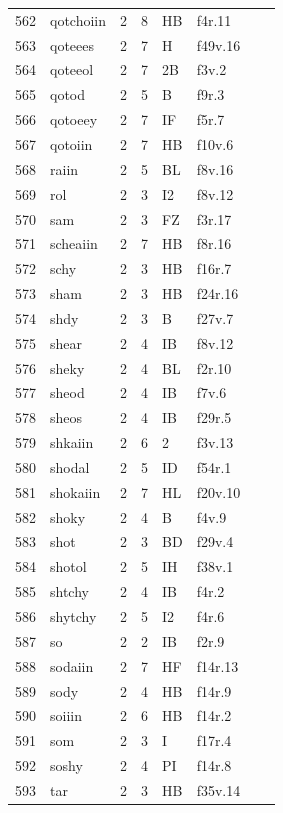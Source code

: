 \documentclass[11pt,a4paper]{article}
\begin{document}
\begin{landscape}
\begin{longtable}{@{}r>{\ttfamily}lrrl>{\ttfamily}l>{\raggedright\arraybackslash}p{80mm}>{\raggedright\arraybackslash}p{36mm}@{}}
562 & qotchoiin & 2 & 8 & HB & f4r.11 &  & \\
563 & qoteees & 2 & 7 & H & f49v.16 &  & \\
564 & qoteeol & 2 & 7 & 2B & f3v.2 &  & \\
565 & qotod & 2 & 5 & B & f9r.3 &  & \\
566 & qotoeey & 2 & 7 & IF & f5r.7 &  & \\
567 & qotoiin & 2 & 7 & HB & f10v.6 &  & \\
568 & raiin & 2 & 5 & BL & f8v.16 &  & \\
569 & rol & 2 & 3 & I2 & f8v.12 &  & \\
570 & sam & 2 & 3 & FZ & f3r.17 &  & \\
571 & scheaiin & 2 & 7 & HB & f8r.16 &  & \\
572 & schy & 2 & 3 & HB & f16r.7 &  & \\
573 & sham & 2 & 3 & HB & f24r.16 &  & \\
574 & shdy & 2 & 3 & B & f27v.7 &  & \\
575 & shear & 2 & 4 & IB & f8v.12 &  & \\
576 & sheky & 2 & 4 & BL & f2r.10 &  & \\
577 & sheod & 2 & 4 & IB & f7v.6 &  & \\
578 & sheos & 2 & 4 & IB & f29r.5 &  & \\
579 & shkaiin & 2 & 6 & 2 & f3v.13 &  & \\
580 & shodal & 2 & 5 & ID & f54r.1 &  & \\
581 & shokaiin & 2 & 7 & HL & f20v.10 &  & \\
582 & shoky & 2 & 4 & B & f4v.9 &  & \\
583 & shot & 2 & 3 & BD & f29v.4 &  & \\
584 & shotol & 2 & 5 & IH & f38v.1 &  & \\
585 & shtchy & 2 & 4 & IB & f4r.2 &  & \\
586 & shytchy & 2 & 5 & I2 & f4r.6 &  & \\
587 & so & 2 & 2 & IB & f2r.9 &  & \\
588 & sodaiin & 2 & 7 & HF & f14r.13 &  & \\
589 & sody & 2 & 4 & HB & f14r.9 &  & \\
590 & soiiin & 2 & 6 & HB & f14r.2 &  & \\
591 & som & 2 & 3 & I & f17r.4 &  & \\
592 & soshy & 2 & 4 & PI & f14r.8 &  & \\
593 & tar & 2 & 3 & HB & f35v.14 &  & \\

\end{longtable}
\end{landscape}
\end{document}
